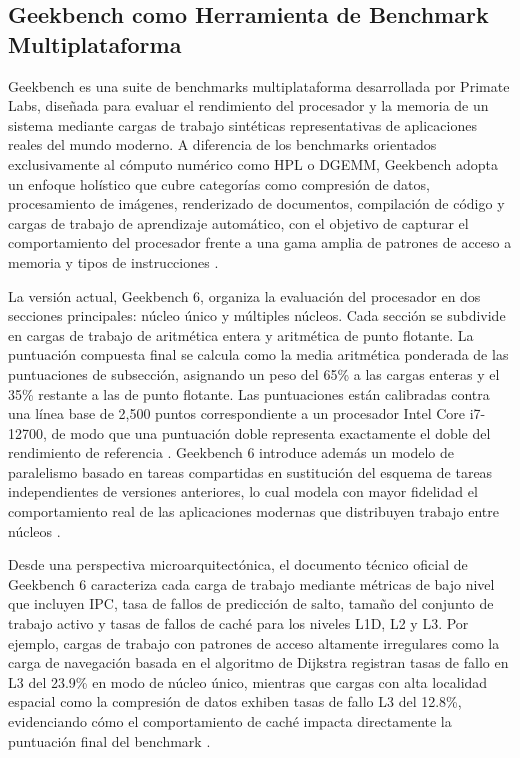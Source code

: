 \subsection{Geekbench como Herramienta de Benchmark Multiplataforma}
Geekbench es una suite de benchmarks multiplataforma desarrollada por Primate Labs, diseñada
para evaluar el rendimiento del procesador y la memoria de un sistema mediante cargas de
trabajo sintéticas representativas de aplicaciones reales del mundo moderno. A diferencia de
los benchmarks orientados exclusivamente al cómputo numérico como HPL o DGEMM, Geekbench
adopta un enfoque holístico que cubre categorías como compresión de datos, procesamiento
de imágenes, renderizado de documentos, compilación de código y cargas de trabajo de
aprendizaje automático, con el objetivo de capturar el comportamiento del procesador frente a
una gama amplia de patrones de acceso a memoria y tipos de instrucciones
\parencite{GeekbenchInternals2024}.

La versión actual, Geekbench 6, organiza la evaluación del procesador en dos secciones
principales: núcleo único y múltiples núcleos. Cada sección se subdivide en cargas de trabajo
de aritmética entera y aritmética de punto flotante. La puntuación compuesta final se calcula
como la media aritmética ponderada de las puntuaciones de subsección, asignando un peso del
65\% a las cargas enteras y el 35\% restante a las de punto flotante. Las puntuaciones están
calibradas contra una línea base de 2,500 puntos correspondiente a un procesador Intel Core
i7-12700, de modo que una puntuación doble representa exactamente el doble del rendimiento
de referencia \parencite{GeekbenchInternals2024}. Geekbench 6 introduce además un modelo de
paralelismo basado en tareas compartidas en sustitución del esquema de tareas independientes
de versiones anteriores, lo cual modela con mayor fidelidad el comportamiento real de las
aplicaciones modernas que distribuyen trabajo entre núcleos \parencite{GeekbenchInternals2024}.

Desde una perspectiva microarquitectónica, el documento técnico oficial de Geekbench 6
caracteriza cada carga de trabajo mediante métricas de bajo nivel que incluyen IPC, tasa de
fallos de predicción de salto, tamaño del conjunto de trabajo activo y tasas de fallos de caché
para los niveles L1D, L2 y L3. Por ejemplo, cargas de trabajo con patrones de acceso
altamente irregulares como la carga de navegación basada en el algoritmo de Dijkstra registran
tasas de fallo en L3 del 23.9\% en modo de núcleo único, mientras que cargas con alta
localidad espacial como la compresión de datos exhiben tasas de fallo L3 del 12.8\%,
evidenciando cómo el comportamiento de caché impacta directamente la puntuación final del
benchmark \parencite{GeekbenchInternals2024}.